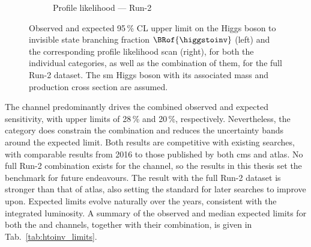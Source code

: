 \begin{figure}[htbp]
\begin{subfigure}[t]{0.45\textwidth}
        \caption{Profile likelihood --- Run-2}
    \end{subfigure}
    \caption[Observed and expected 95\,\% CL upper limit on the Higgs boson to invisible state branching fraction $\BRof{\higgstoinv}$ and the corresponding profile likelihood scan, for both the individual categories, as well as the combination of them, for the full Run-2 dataset]{Observed and expected 95\,\% CL upper limit on the Higgs boson to invisible state branching fraction $\BRof{\higgstoinv}$ (left) and the corresponding profile likelihood scan (right), for both the individual categories, as well as the combination of them, for the full Run-2 dataset. The \acrlong{sm} Higgs boson with its associated mass and production cross section are assumed.}
    \label{fig:htoinv_limit_likelihood_Run2_per_cat}
\end{figure}

The \VH channel predominantly drives the combined observed and expected sensitivity, with upper limits of 28\,\% and 20\,\%, respectively. Nevertheless, the \ttH category does constrain the combination and reduces the uncertainty bands around the expected limit. Both results are competitive with existing searches, with comparable results from 2016 to those published by both \acrshort{cms} and \acrshort{atlas}. No full Run-2 combination exists for the \VH channel, so the results in this thesis set the benchmark for future endeavours. The \ttH result with the full Run-2 dataset is stronger than that of \acrshort{atlas}, also setting the standard for later searches to improve upon. Expected limits evolve naturally over the years, consistent with the integrated luminosity. A summary of the observed and median expected limits for both the \ttH and \VH channels, together with their combination, is given in Tab.~\ref{tab:htoinv_limits}.

